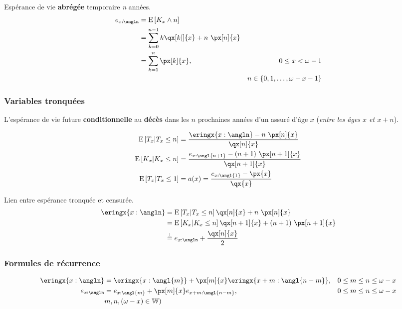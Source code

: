 \documentclass[10pt, french]{article}
\begin{document}
\begin{multicols*}{3}
Espérance de vie \textbf{abrégée} temporaire \textit{n} années.
\begin{align*}
e_{x:\angln} &= \esp{K_x \wedge n} \\
&= \sum_{k = 0}^{n - 1} k \qx[k | ]{x} + n \ \px[n]{x} \\
&= \sum_{k = 1}^{n} \px[k]{x}, & 0 \leq x < \omega - 1 \\
&& n \in \{0, 1, \dots, \omega - x - 1\}
\end{align*}

\subsubsection{Variables tronquées}
L'espérance de vie future \textbf{conditionnelle} au \textbf{décès} dans les $n$ prochaines années d'un assuré d'âge $x$ (\textit{entre les âges $x$ et $x+n$}).

\begin{align*}
	\esp{T_x | T_x \leq n} &= \frac{\eringx{x:\angln} - n \ \px[n]{x}}{\qx[n]{x}} \\
	\esp{K_x | K_x \leq n} &= \frac{e_{x:\angl{n + 1}} - (n + 1) \ \px[n + 1]{x}}{\qx[n + 1]{x}} \\	
	\esp{T_x | T_x \leq 1} &= a(x) = \frac{e_{x:\angl{1}} - \px{x}}{\qx{x}} \\	
\end{align*}

Lien entre espérance tronquée et censurée.
\begin{align*}
	\eringx{x:\angln} &= \esp{T_x | T_x \leq n} \qx[n]{x} + n \ \px[n]{x} \\	
		&= \esp{K_x | K_x \leq n} \qx[n + 1]{x} + (n + 1) \ \px[n + 1]{x} \\	
		&\stackrel{\bot}= e_{x:\angln} + \frac{\qx[n]{x}}{2} 
\end{align*}

\subsubsection{Formules de récurrence}

\begin{align*}
	\eringx{x:\angln} &= \eringx{x:\angl{m}} + \px[m]{x} \eringx{x + m:\angl{n - m}}, & 0 \leq m \leq n \leq \omega - x  \\
	e_{x:\angln} &= e_{x:\angl{m}} + \px[m]{x} e_{x + m:\angl{n - m}}, & 0 \leq m \leq n \leq \omega - x  \\
	&m, n, (\omega - x) \in \mathbb{W})
\end{align*}


\end{multicols*}
\end{document}

